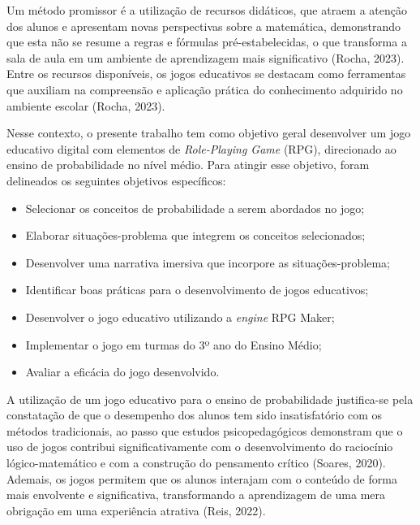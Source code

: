 Um método promissor é a utilização de recursos didáticos, que atraem a atenção dos alunos e apresentam novas perspectivas sobre a matemática, demonstrando que esta não se resume a regras e fórmulas pré-estabelecidas, o que transforma a sala de aula em um ambiente de aprendizagem mais significativo (Rocha, 2023). Entre os recursos disponíveis, os jogos educativos se destacam como ferramentas que auxiliam na compreensão e aplicação prática do conhecimento adquirido no ambiente escolar (Rocha, 2023).

Nesse contexto, o presente trabalho tem como objetivo geral desenvolver um jogo educativo digital com elementos de \textit{Role-Playing Game} (RPG), direcionado ao ensino de probabilidade no nível médio. Para atingir esse objetivo, foram delineados os seguintes objetivos específicos: 

        \begin{itemize}
        	
        	\item Selecionar os conceitos de probabilidade a serem abordados no jogo;
            \item Elaborar situações-problema que integrem os conceitos selecionados;
            \item Desenvolver uma narrativa imersiva que incorpore as situações-problema; 
            \item Identificar boas práticas para o desenvolvimento de jogos educativos; 
            \item Desenvolver o jogo educativo utilizando a \textit{engine} RPG Maker; 
            \item Implementar o jogo em turmas do 3º ano do Ensino Médio; 
            \item Avaliar a eficácia do jogo desenvolvido.
            
        \end{itemize}
        
A utilização de um jogo educativo para o ensino de probabilidade justifica-se pela constatação de que o desempenho dos alunos tem sido insatisfatório com os métodos tradicionais, ao passo que estudos psicopedagógicos demonstram que o uso de jogos contribui significativamente com o desenvolvimento do raciocínio lógico-matemático e com a construção do pensamento crítico (Soares, 2020). Ademais, os jogos permitem que os alunos interajam com o conteúdo de forma mais envolvente e significativa, transformando a aprendizagem de uma mera obrigação em uma experiência atrativa (Reis, 2022).

